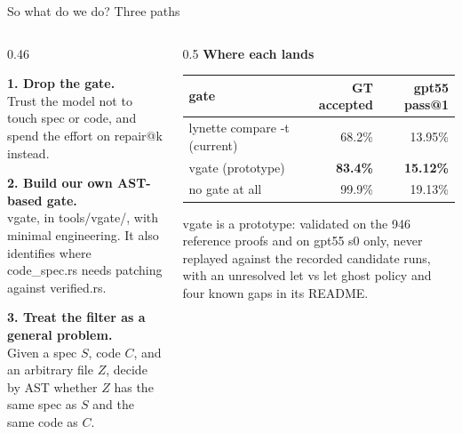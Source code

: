 \documentclass[aspectratio=169,10pt]{beamer}
\newcommand{\code}[1]{{\ttfamily #1}}
\newcommand{\hd}[1]{\textbf{\color{lgTeal}#1}}
\newcommand{\good}[1]{{\color{lgGreen}#1}}
\begin{document}
\begin{frame}{So what do we do? Three paths}

\begin{columns}[T]
\begin{column}{0.46\textwidth}
{\scriptsize
\hd{1. Drop the gate.}\\
Trust the model not to touch spec or code, and spend the effort on repair@k instead.

\vspace{7pt}
\hd{2. Build our own AST-based gate.}\\
\code{vgate}, in \code{tools/vgate/}, with minimal engineering. It also identifies where
\code{code\_spec.rs} needs patching against \code{verified.rs}.

\vspace{7pt}
\hd{3. Treat the filter as a general problem.}\\
Given a spec $S$, code $C$, and an arbitrary file $Z$, decide by AST whether $Z$ has the same
spec as $S$ and the same code as $C$.
}
\end{column}

\begin{column}{0.5\textwidth}
{\scriptsize\hd{Where each lands}}\\[3pt]
{\scriptsize
\begin{tabular}{lrr}
\toprule
\textbf{gate} & \textbf{GT accepted} & \textbf{gpt55 pass@1} \\
\midrule
\code{lynette compare -t} (current) & 68.2\% & 13.95\% \\
\code{vgate} (prototype)   & \good{\textbf{83.4\%}} & \good{\textbf{15.12\%}} \\
no gate at all                      & 99.9\% & 19.13\% \\
\bottomrule
\end{tabular}
}

\vspace{10pt}
\begin{callout}[lgGrey]
\tiny
\code{vgate} is a prototype: validated on the 946 reference proofs and on gpt55 s0 only,
never replayed against the recorded candidate runs, with an unresolved \code{let} vs
\code{let ghost} policy and four known gaps in its README.
\end{callout}
\end{column}
\end{columns}

\end{frame}
\end{document}
